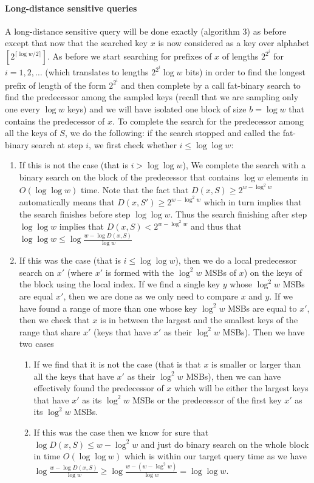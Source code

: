 \documentclass[11pt]{llncs}
\begin{document}
\paragraph{Long-distance sensitive queries}
A long-distance sensitive query will be done exactly (algorithm 3) as before except that now that the searched key $x$ is now considered as a key over alphabet $[2^{\lceil\log w/2\rceil}]$. As before we start searching for prefixes of $x$ of lengths $2^{2^i}$ for $i=1,2,\ldots$ (which translates to lengths $2^{2^i}\log w$ bits) in order to find the longest prefix of length of the form $2^{2^i}$ and then complete by a call fat-binary search to find the predecessor among the sampled keys (recall that we are sampling only one every $\log w$ keys) and we will have isolated one block of size $b=\log w$ that contains the predecessor of $x$. To complete the search for the predecessor among all the keys of $S$, we do the following: if the search stopped and called the fat-binary search at step $i$, we first check whether $i\leq\log\log w$:
\begin{enumerate}
\item If this is not the case (that is $i>\log\log w$), We complete the search with a binary search on the block of the predecessor that contains $\log w$ elements in $O(\log\log w)$ time. Note that the fact that $D(x,S)\geq 2^{w-\log^2w}$ automatically means that $D(x,S')\geq 2^{w-\log^2w}$ which in turn implies that the search finishes before step $\log\log w$. Thus the search finishing after step $\log\log w$ implies that $D(x,S)< 2^{w-\log^2w}$ and thus that $\log\log w\leq \log\frac{w-\log D(x,S)}{\log w}$
\item If this was the case (that is $i\leq\log\log w$), then we do a local predecessor search on $x'$ (where $x'$ is formed with the $\log^2 w$ MSBs of $x$) on the keys of the block using the local index. If we find a single key $y$ whose $\log^2 w$ MSBs are equal $x'$, then we are done as we only need to compare $x$ and $y$. If we have found a range of more than one whose key $\log^2 w$ MSBs are equal  to $x'$, then we check that $x$ is in between the largest and the smallest keys of the range that share $x'$ (keys that have $x'$ as their $\log^2w$ MSBs). Then we have two cases
\begin{enumerate}
\item If we find that it is not the case (that is that $x$ is smaller or larger than all the keys that have $x'$ as their $\log^2w$ MSBs), then we can have effectively found the predecessor of $x$ which will be either the largest keys that have $x'$ as its $\log^2w$ MSBs or the predecessor of the first key $x'$ as its $\log^2w$ MSBs. 
\item If this was the case then we know for sure that $\log D(x,S)\leq w-\log^2 w$ and just do binary search on the whole block in time $O(\log\log w)$  which is within our target query time as we have $\log\frac{w-\log D(x,S)}{\log w}\geq \log\frac{w-(w-\log^2w)}{\log w}=\log\log w$. 
\end{enumerate}
\end{enumerate}
\end{document}

